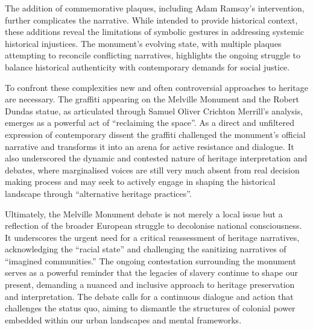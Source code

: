 \documentclass{scrartcl}
\begin{document}
The addition of commemorative plaques, including Adam Ramsay's intervention, further complicates the narrative. While intended to provide historical context, these additions reveal the limitations of symbolic gestures in addressing systemic historical injustices. The monument's evolving state, with multiple plaques attempting to reconcile conflicting narratives, highlights the ongoing struggle to balance historical authenticity with contemporary demands for social justice.

To confront these complexities new and often controversial approaches to heritage are necessary. The graffiti appearing on the Melville Monument and the Robert Dundas statue, as articulated through Samuel Oliver Crichton Merrill's analysis, emerges as a powerful act of ``reclaiming the space''. As a direct and unfiltered expression of contemporary dissent the graffiti  challenged the monument's official narrative and transforms it into an arena for active resistance and dialogue. It also underscored the dynamic and contested nature of heritage interpretation and debates, where marginalised voices are still very much absent from real decision making process and may seek to actively engage in shaping the historical landscape through ``alternative heritage practices''.

Ultimately, the Melville Monument debate is not merely a local issue but a reflection of the broader European struggle to decolonise national consciousness. It underscores the urgent need for a critical reassessment of heritage narratives, acknowledging the ``racial state'' and challenging the sanitizing narratives of ``imagined communities.'' The ongoing contestation surrounding the monument serves as a powerful reminder that the legacies of slavery continue to shape our present, demanding a nuanced and inclusive approach to heritage preservation and interpretation. The debate calls for a continuous dialogue and action that challenges the status quo, aiming to dismantle the structures of colonial power embedded within our urban landscapes and mental frameworks.
\end{document}

